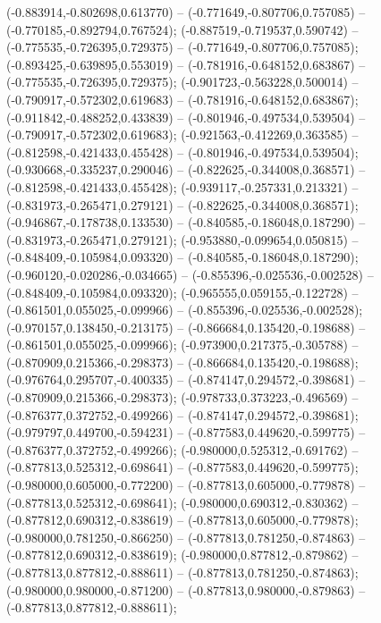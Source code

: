  (-0.883914,-0.802698,0.613770) -- (-0.771649,-0.807706,0.757085) -- (-0.770185,-0.892794,0.767524);
 (-0.887519,-0.719537,0.590742) -- (-0.775535,-0.726395,0.729375) -- (-0.771649,-0.807706,0.757085);
 (-0.893425,-0.639895,0.553019) -- (-0.781916,-0.648152,0.683867) -- (-0.775535,-0.726395,0.729375);
 (-0.901723,-0.563228,0.500014) -- (-0.790917,-0.572302,0.619683) -- (-0.781916,-0.648152,0.683867);
 (-0.911842,-0.488252,0.433839) -- (-0.801946,-0.497534,0.539504) -- (-0.790917,-0.572302,0.619683);
 (-0.921563,-0.412269,0.363585) -- (-0.812598,-0.421433,0.455428) -- (-0.801946,-0.497534,0.539504);
 (-0.930668,-0.335237,0.290046) -- (-0.822625,-0.344008,0.368571) -- (-0.812598,-0.421433,0.455428);
 (-0.939117,-0.257331,0.213321) -- (-0.831973,-0.265471,0.279121) -- (-0.822625,-0.344008,0.368571);
 (-0.946867,-0.178738,0.133530) -- (-0.840585,-0.186048,0.187290) -- (-0.831973,-0.265471,0.279121);
 (-0.953880,-0.099654,0.050815) -- (-0.848409,-0.105984,0.093320) -- (-0.840585,-0.186048,0.187290);
 (-0.960120,-0.020286,-0.034665) -- (-0.855396,-0.025536,-0.002528) -- (-0.848409,-0.105984,0.093320);
 (-0.965555,0.059155,-0.122728) -- (-0.861501,0.055025,-0.099966) -- (-0.855396,-0.025536,-0.002528);
 (-0.970157,0.138450,-0.213175) -- (-0.866684,0.135420,-0.198688) -- (-0.861501,0.055025,-0.099966);
 (-0.973900,0.217375,-0.305788) -- (-0.870909,0.215366,-0.298373) -- (-0.866684,0.135420,-0.198688);
 (-0.976764,0.295707,-0.400335) -- (-0.874147,0.294572,-0.398681) -- (-0.870909,0.215366,-0.298373);
 (-0.978733,0.373223,-0.496569) -- (-0.876377,0.372752,-0.499266) -- (-0.874147,0.294572,-0.398681);
 (-0.979797,0.449700,-0.594231) -- (-0.877583,0.449620,-0.599775) -- (-0.876377,0.372752,-0.499266);
 (-0.980000,0.525312,-0.691762) -- (-0.877813,0.525312,-0.698641) -- (-0.877583,0.449620,-0.599775);
 (-0.980000,0.605000,-0.772200) -- (-0.877813,0.605000,-0.779878) -- (-0.877813,0.525312,-0.698641);
 (-0.980000,0.690312,-0.830362) -- (-0.877812,0.690312,-0.838619) -- (-0.877813,0.605000,-0.779878);
 (-0.980000,0.781250,-0.866250) -- (-0.877813,0.781250,-0.874863) -- (-0.877812,0.690312,-0.838619);
 (-0.980000,0.877812,-0.879862) -- (-0.877813,0.877812,-0.888611) -- (-0.877813,0.781250,-0.874863);
 (-0.980000,0.980000,-0.871200) -- (-0.877813,0.980000,-0.879863) -- (-0.877813,0.877812,-0.888611);
